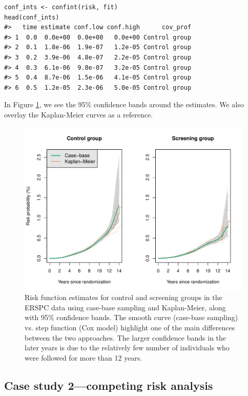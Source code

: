 \begin{verbatim}
conf_ints <- confint(risk, fit)
head(conf_ints)
#>   time estimate conf.low conf.high      cov_prof
#> 1  0.0  0.0e+00  0.0e+00   0.0e+00 Control group
#> 2  0.1  1.8e-06  1.9e-07   1.2e-05 Control group
#> 3  0.2  3.9e-06  4.8e-07   2.2e-05 Control group
#> 4  0.3  6.1e-06  9.0e-07   3.2e-05 Control group
#> 5  0.4  8.7e-06  1.5e-06   4.1e-05 Control group
#> 6  0.5  1.2e-05  2.3e-06   5.0e-05 Control group
\end{verbatim}

In Figure \ref{fig:erspc-cif-conf}, we see the 95\% confidence bands around the estimates.
We also overlay the Kaplan-Meier curves as a reference.

\begin{figure}[ht]
\includegraphics[width=\textwidth,keepaspectratio=true]{./erspc-cif-conf-1} \caption{Risk function estimates for control and screening groups in the ERSPC data using case-base sampling and Kaplan-Meier, along with 95\% confidence bands. The smooth curve (case-base sampling) vs. step function (Cox model) highlight one of the main differences between the two approaches. The larger confidence bands in the later years is due to the relatively few number of individuals who were followed for more than 12 years.}\label{fig:erspc-cif-conf}
\end{figure}

\hypertarget{case-study-2competing-risk-analysis}{%
\subsection{Case study 2---competing risk analysis}\label{case-study-2competing-risk-analysis}}


